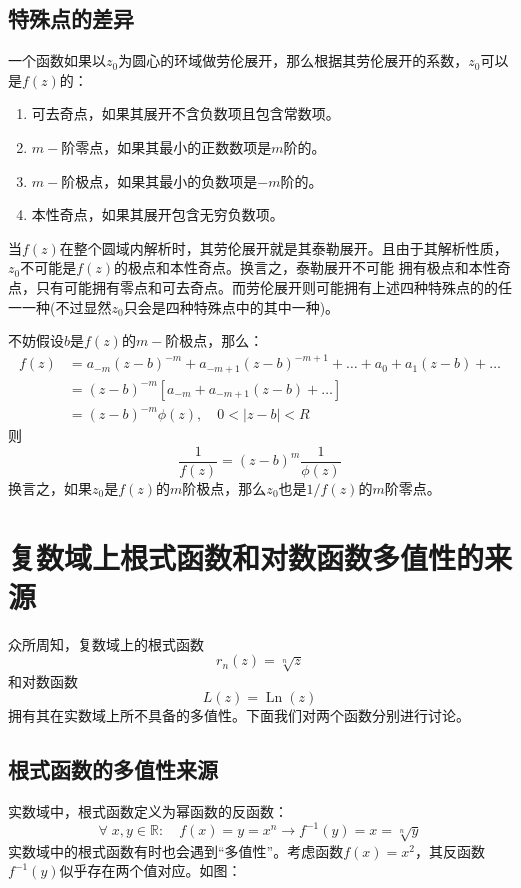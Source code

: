 \documentclass[12pt, a4paper, oneside]{ctexart}
\newcommand{\F}[1][z]
{\ensuremath{f(#1)}}
\begin{document}
\subsection{特殊点的差异}
一个函数如果以$z_0$为圆心的环域做劳伦展开，那么根据其劳伦展开的系数，$z_0$可以是$f(z)$的：
\begin{enumerate}
    \item 可去奇点，如果其展开不含负数项且包含常数项。
    \item $m-$阶零点，如果其最小的正数数项是$m$阶的。
    \item $m-$阶极点，如果其最小的负数项是$-m$阶的。
    \item 本性奇点，如果其展开包含无穷负数项。
\end{enumerate}
当$f(z)$在整个圆域内解析时，其劳伦展开就是其泰勒展开。且由于其解析性质，$z_0$不可能是$f(z)$的极点和本性奇点。换言之，泰勒展开不可能
拥有极点和本性奇点，只有可能拥有零点和可去奇点。而劳伦展开则可能拥有上述四种特殊点的的任一一种(不过显然$z_0$只会是四种特殊点中的其中一种)。

不妨假设$b$是$\F$的$m-$阶极点，那么：
$$
\begin{aligned}
f(z) &=a_{-m}(z-b)^{-m}+a_{-m+1}(z-b)^{-m+1}+\ldots+a_{0}+a_{1}(z-b)+\ldots \\
&=(z-b)^{-m}\left[a_{-m}+a_{-m+1}(z-b)+\ldots\right] \\
&=(z-b)^{-m} \phi(z), \quad 0<|z-b|<R
\end{aligned}
$$
则
$$
\frac{1}{f(z)}=(z-b)^{m} \frac{1}{\phi(z)}
$$
换言之，如果$z_0$是$\F$的$m$阶极点，那么$z_0$也是$1/\F$的$m$阶零点。

\section{复数域上根式函数和对数函数多值性的来源}
众所周知，复数域上的根式函数
$$
r_n(z)=\sqrt[n]{z}
$$
和对数函数
$$
L(z)=\operatorname{Ln}(z)
$$
拥有其在实数域上所不具备的多值性。下面我们对两个函数分别进行讨论。
\subsection{根式函数的多值性来源}
实数域中，根式函数定义为幂函数的反函数：
$$\forall\; x,y\in \mathbb{R}:\quad f(x)=y=x^n \to f^{-1}(y)=x=\sqrt[n]{y}$$
实数域中的根式函数有时也会遇到“多值性”。考虑函数$f(x)=x^2$，其反函数$f^{-1}(y)$似乎存在两个值对应。如图：
\end{document}
